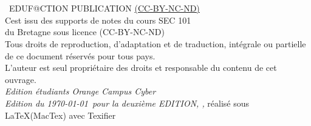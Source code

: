 


\newpage

~\vfill
\thispagestyle{empty}

\INFOGitHubS

\noindent {\Huge\ccbyncndeu}\\ 

\noindent \the\year~EDUF@CTION PUBLICATION \href{https://creativecommons.org/licenses/by-nc-nd/2.0/fr/}{(CC-BY-NC-ND)}\\ %

\noindent C\edoc est issu des supports de notes du cours SEC 101\\ 
du \uCnam Bretagne sous licence (CC-BY-NC-ND)\\






\noindent Tous droits de reproduction, d’adaptation et de traduction, intégrale ou partielle de ce document réservés pour tous pays.\\

\noindent L’auteur est seul propriétaire des droits et responsable du contenu de cet ouvrage.\\

\noindent \textit{Edition étudiants Orange Campus Cyber} \\

\noindent \textit{Edition du \today~pour la deuxième EDITION,  \printer, } réalisé sous \LaTeX (MacTex) avec Texifier \faApple


